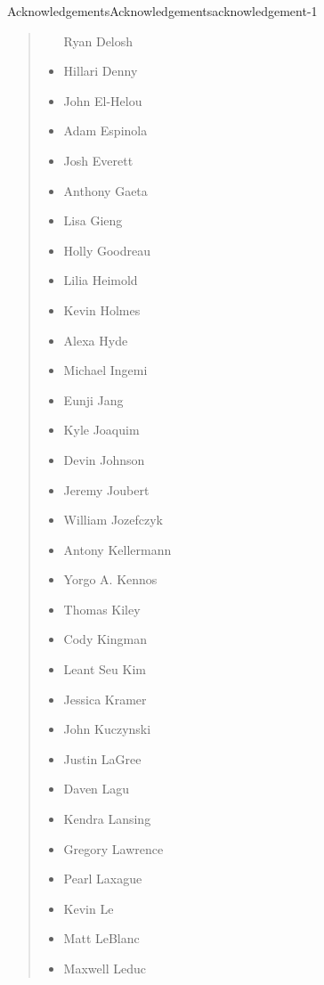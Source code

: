 \documentclass[twoside,10pt,]{book}
\numberwithin{equation}{section}
\begin{document}
\begin{acknowledgement}{Acknowledgements}{}{Acknowledgements}{}{}{acknowledgement-1}
\begin{quote}
\begin{multicols}{2}
\begin{itemize}[label=\textbullet]
Ryan Delosh%
\item{}\hypertarget{p-42}{}%
Hillari Denny%
\item{}\hypertarget{p-43}{}%
John El-Helou%
\item{}\hypertarget{p-44}{}%
Adam Espinola%
\item{}\hypertarget{p-45}{}%
Josh Everett%
\item{}\hypertarget{p-46}{}%
Anthony Gaeta%
\item{}\hypertarget{p-47}{}%
Lisa Gieng%
\item{}\hypertarget{p-48}{}%
Holly Goodreau%
\item{}\hypertarget{p-49}{}%
Lilia Heimold%
\item{}\hypertarget{p-50}{}%
Kevin Holmes%
\item{}\hypertarget{p-51}{}%
Alexa Hyde%
\item{}\hypertarget{p-52}{}%
Michael Ingemi%
\item{}\hypertarget{p-53}{}%
Eunji Jang%
\item{}\hypertarget{p-54}{}%
Kyle Joaquim%
\item{}\hypertarget{p-55}{}%
Devin Johnson%
\item{}\hypertarget{p-56}{}%
Jeremy Joubert%
\item{}\hypertarget{p-57}{}%
William Jozefczyk%
\item{}\hypertarget{p-58}{}%
Antony Kellermann%
\item{}\hypertarget{p-59}{}%
Yorgo A. Kennos%
\item{}\hypertarget{p-60}{}%
Thomas Kiley%
\item{}\hypertarget{p-61}{}%
Cody Kingman%
\item{}\hypertarget{p-62}{}%
Leant Seu Kim%
\item{}\hypertarget{p-63}{}%
Jessica Kramer%
\item{}\hypertarget{p-64}{}%
John Kuczynski%
\item{}\hypertarget{p-65}{}%
Justin LaGree%
\item{}\hypertarget{p-66}{}%
Daven Lagu%
\item{}\hypertarget{p-67}{}%
Kendra Lansing%
\item{}\hypertarget{p-68}{}%
Gregory Lawrence%
\item{}\hypertarget{p-69}{}%
Pearl Laxague%
\item{}\hypertarget{p-70}{}%
Kevin Le%
\item{}\hypertarget{p-71}{}%
Matt LeBlanc%
\item{}\hypertarget{p-72}{}%
Maxwell Leduc%

\end{itemize}
\end{multicols}
\end{quote}
\end{acknowledgement}
\end{document}
